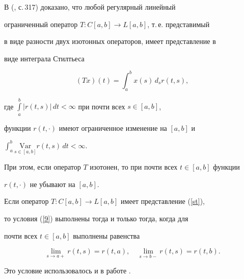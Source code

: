 \begin{notes}


В (\cite{KVP}, с.\,317) доказано, что любой регулярный линейный


ограниченный оператор $T: C[a,b]\to L[a,b]$, т.\,е. представимый


в виде разности двух изотонных операторов, имеет представление в


виде интеграла Стилтьеса


\begin{equation}\label{st}


(Tx)(t)=\int_a^bx(s)\,d_sr(t,s),


\end{equation}


где $\int\limits_a^b|r(t,s)|\,dt<\infty$ при почти всех $s\in[a,b]$,


функции $r(t,\cdot)$ имеют ограниченное изменение на $[a,b]$ и


$\int_a^b \underset{s\in[a,b]}{\mathrm{Var}}{} r(t,s)\, dt<\infty$.


При этом, если оператор $T$ изотонен, то при почти всех $t\in[a,b]$ функции


$r(t,\cdot)$ не убывают на $[a,b]$.





Если оператор $T: C[a,b]\to L[a,b]$ имеет представление (\ref{st}),


то условия (\ref{9}) выполнены тогда и только тогда, когда для


почти всех $t\in[a,b]$ выполнены равенства


\begin{equation}\label{n9}


\lim_{s\to a+}r(t,s)=r(t,a),\quad \lim_{s\to b-}r(t,s)=r(t,b).


\end{equation}


Это условие использовалось и в работе \cite{Lab2}.


\end{notes}





